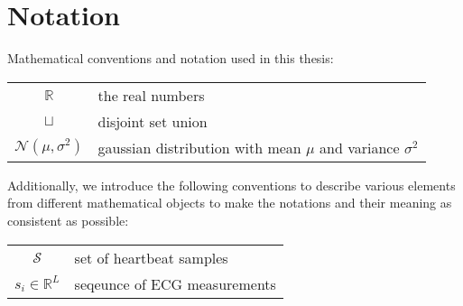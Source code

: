
\section*{Notation}
Mathematical conventions and notation used in this thesis:

\begin{center}
    \renewcommand{\arraystretch}{1.5}
    \begin{tabular}{ c l }
        
        $\mathbb{R}$ & the real numbers \\
        $\sqcup$ & disjoint set union \\
        $\mathcal{N}(\mu, \sigma^2)$ & gaussian distribution with mean $\mu$ and variance $\sigma^2$
    \end{tabular}
\end{center}

Additionally, we introduce the following conventions to describe various elements from different mathematical objects to make the notations and their meaning as consistent as possible:

\begin{center}
    \renewcommand{\arraystretch}{1.5}
    \begin{tabular}{c l}
        $\mathcal{S}$ & set of heartbeat samples \\
        $s_i \in \mathbb{R}^L$ & seqeunce of ECG measurements


    \end{tabular}
\end{center}
